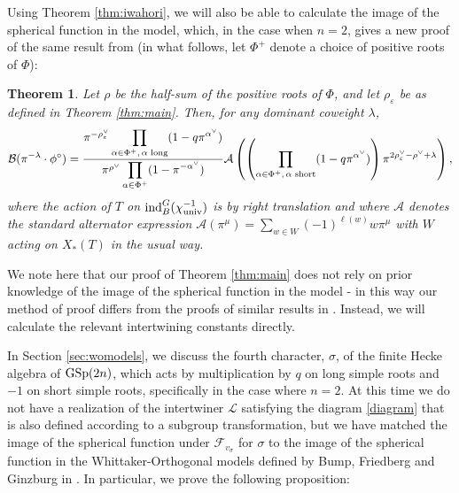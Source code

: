\documentclass[11pt,letterpaper]{article}
\newcommand{\calL}{\mathcal{L}} %
\newcommand{\A}{\mathcal{A}}
\newcommand{\calB}{\mathcal{B}}
\newcommand{\calF}{\mathcal{F}}
\newcommand{\ve}{\varepsilon}
\newcommand{\GSp}{\textup{GSp}}
\newcommand{\calHom}{\textup{Hom}}
\newcommand{\Ind}{\textup{Ind}}
\newcommand{\ind}{\textup{ind}}
\newtheorem{Theorem}{Theorem}[section]
\theoremstyle{remark}
\numberwithin{equation}{section}
\begin{document}
Using Theorem \ref{thm:iwahori}, we will also be able to calculate the image of the spherical function in the model, which, in the case when $n=2$, gives a new proof of the same result from \cite{BFF} (in what follows, let $\Phi^+$ denote a choice of positive roots of $\Phi$):


\begin{Theorem}\label{thm:spherical}
Let $\rho$ be the half-sum of the positive roots of $\Phi$, and let $\rho_{\ve}$ be as defined in Theorem \ref{thm:main}. Then, for any dominant coweight $\lambda$, $$\calB(\pi^{-\lambda}\cdot \phi^{\circ}) = \frac{\pi^{-\rho_{\ve}^{\vee}}\displaystyle\prod_{\alpha \in \Phi^+,\, \alpha \textup{ long}} (1-q\pi^{\alpha^{\vee}})} {\pi^{\rho^{\vee}}\displaystyle\prod_{\alpha \in \Phi^+} (1-\pi^{-\alpha^{\vee}})} \A\left(\left( \prod_{\alpha \in \Phi^+,\,\alpha \textup{ short}} (1-q\pi^{\alpha^{\vee}})\right) \pi^{2\rho_{\ve}^{\vee}-\rho^{\vee}+\lambda}\right),$$ where the action of $T$ on $\ind_B^G (\chi_{\textup{univ}}^{-1})$ is by right translation and where $\A$ denotes the standard alternator expression $\A(\pi^{\mu}) = \sum_{w \in W}(-1)^{\ell(w)}w\pi^{\mu}$ with $W$ acting on $X_{\ast}(T)$ in the usual way.
\end{Theorem}

We note here that our proof of Theorem \ref{thm:main} does not rely on prior knowledge of the image of the spherical function in the model - in this way our method of proof differs from the proofs of similar results in \cite{BBF2}. Instead, we will calculate the relevant intertwining constants directly. %

In Section \ref{sec:womodels}, we discuss the fourth character, $\sigma$, of the finite Hecke algebra of $\GSp(2n)$, which acts by multiplication by $q$ on long simple roots and $-1$ on short simple roots, specifically in the case where $n=2$. At this time we do not have a realization of the intertwiner $\calL$ satisfying the diagram \eqref{diagram} that is also defined according to a subgroup transformation, but we have matched the image of the spherical function under $\calF_{v_\sigma}$ for $\sigma$ to the image of the spherical function in the Whittaker-Orthogonal models defined by Bump, Friedberg and Ginzburg in \cite{BFG}. In particular, we prove the following proposition:
\end{document}
